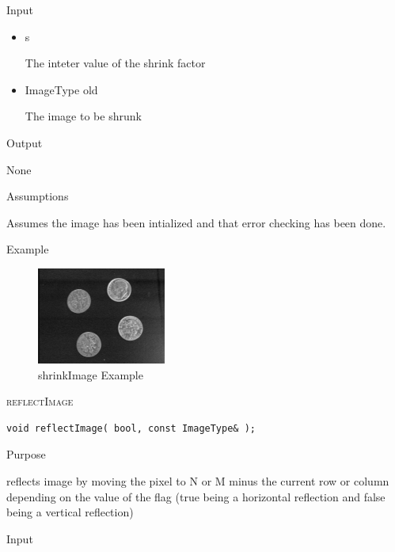 \documentclass[pdftex, 11pt]{article}
\begin{document}
\begin{description}
\begin{description}
			\item{Input}

				\begin{itemize}

					\item{s}

						The inteter value of the shrink factor

					\item{ImageType old}

						The image to be shrunk

				\end{itemize}

			\item{Output}

				None

			\item{Assumptions}

				Assumes the image has been intialized and that error
				checking has been done.

			\item{Example}

				\begin{figure}[h]
					\centering
					\caption{shrinkImage Example}
				\includegraphics{images/outshrink.png}
			\end{figure}

		\end{description}


	\item{\textsc{reflectImage}}
		\begin{description}

\begin{lstlisting}
void reflectImage( bool, const ImageType& );
\end{lstlisting}

			\item{Purpose}

				reflects image by moving the pixel to N or M
				minus the current row or column
				depending on the value of the flag
				(true being a horizontal reflection and
				false being a vertical reflection)

			\item{Input}


\end{description}
\end{description}
\end{document}
